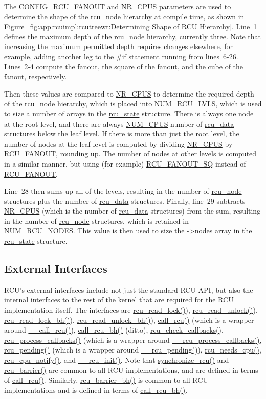 The \url{CONFIG_RCU_FANOUT} and \url{NR_CPUS} parameters are used to
determine the shape of the \url{rcu_node} hierarchy at compile time,
as shown in
Figure~\ref{fig:app:rcuimpl:rcutreewt:Determining Shape of RCU Hierarchy}.
Line~1 defines the maximum depth of the \url{rcu_node} hierarchy,
currently three.
Note that increasing the maximum permitted depth requires changes
elsewhere, for example, adding another leg to the \url{#if}
statement running from lines~6-26.
Lines~2-4 compute the fanout, the square of the fanout, and the cube
of the fanout, respectively.

Then these values are compared to \url{NR_CPUS} to determine the required
depth of the \url{rcu_node} hierarchy, which is placed into
\url{NUM_RCU_LVLS}, which is used to size a number of arrays
in the \url{rcu_state} structure.
There is always one node at the root level, and there are always
\url{NUM_CPUS} number of \url{rcu_data} structures below the leaf
level.
If there is more than just the root level, the number of nodes at
the leaf level is computed
by dividing \url{NR_CPUS} by \url{RCU_FANOUT}, rounding up.
The number of nodes at other levels is computed in a similar manner,
but using (for example) \url{RCU_FANOUT_SQ} instead of \url{RCU_FANOUT}.

Line~28 then sums up all of the levels, resulting in the number of
\url{rcu_node} structures plus the number of \url{rcu_data} structures.
Finally, line~29 subtracts \url{NR_CPUS} (which is the number of
\url{rcu_data} structures) from the sum, resulting in the number
of \url{rcu_node} structures, which is retained in
\url{NUM_RCU_NODES}.
This value is then used to size the \url{->nodes} array in the
\url{rcu_state} structure.

\subsection{External Interfaces}
\label{app:rcuimpl:rcutreewt:External Interfaces}

RCU's external interfaces include not just the standard RCU API,
but also the internal interfaces to the rest of the kernel that
are required for the RCU implementation itself.
The interfaces are
\url{rcu_read_lock()}),
\url{rcu_read_unlock()}),
\url{rcu_read_lock_bh()}),
\url{rcu_read_unlock_bh()}),
\url{call_rcu()} (which is a wrapper around
\url{__call_rcu()}),
\url{call_rcu_bh()} (ditto),
\url{rcu_check_callbacks()},
\url{rcu_process_callbacks()} (which is a wrapper around
\url{__rcu_process_callbacks()},
\url{rcu_pending()} (which is a wrapper around
\url{__rcu_pending()}),
\url{rcu_needs_cpu()},
\url{rcu_cpu_notify()}, and
\url{__rcu_init()}.
Note that \url{synchronize_rcu()} and \url{rcu_barrier()} are
common to all RCU implementations, and are defined in terms of
\url{call_rcu()}.
Similarly, \url{rcu_barrier_bh()} is common to all RCU implementations
and is defined in terms of \url{call_rcu_bh()}.

